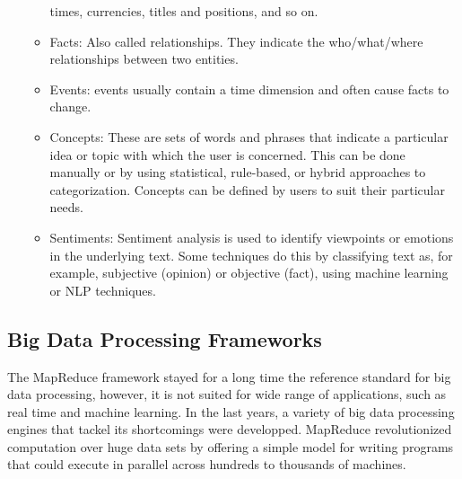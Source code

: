 \begin{enumerate}
\begin{itemize}
times, currencies, titles and positions, and so on. 
\item  Facts: Also called relationships. They indicate the who/what/where relationships
between two entities. 
\item  Events: events usually contain a time dimension and often cause facts to
change. 
\item  Concepts: These are sets of words and phrases that indicate a particular
idea or topic with which the user is concerned. This can be done
manually or by using statistical, rule-based, or hybrid approaches to
categorization. Concepts can be defined by users to suit their particular needs.
\item  Sentiments: Sentiment analysis is used to identify viewpoints or emotions
in the underlying text. Some techniques do this by classifying text as, for example, subjective (opinion) or objective (fact), using machine learning or NLP techniques.
\end{itemize}
\end{enumerate}
\subsection{Big Data Processing Frameworks}
The MapReduce \cite{a:mapR} framework stayed for a long time the reference standard for big data processing,
however, it is not suited for wide range of applications, such as
real time and machine learning. In the last years, a variety of
big data processing engines that tackel its shortcomings were
developped.
MapReduce revolutionized computation over huge data sets by
offering a simple model for writing programs that could execute in parallel across hundreds to thousands of machines. 
